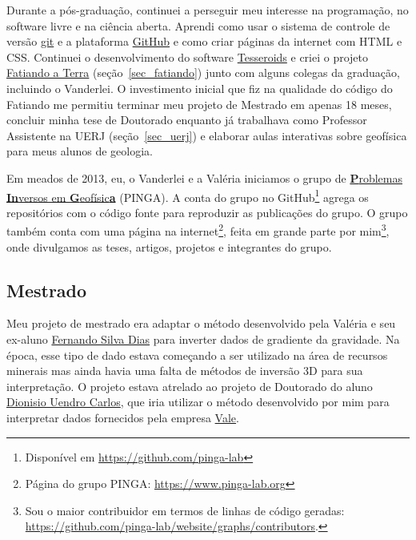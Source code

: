 \documentclass[10pt,a4paper,oneside]{book}
\begin{document}
Durante a pós-graduação, continuei a perseguir meu interesse na programação,
no software livre e na ciência aberta.
Aprendi como usar o sistema de controle de versão
\href{https://git-scm.com/}{git} e a plataforma
\href{https://github.com}{GitHub} e como criar páginas da internet com HTML e
CSS.
Continuei o desenvolvimento do software \href{https://tesseroids.leouieda.com/}{Tesseroids}
e criei o projeto \href{https://www.fatiando.org}{Fatiando a Terra}
(seção~\ref{sec_fatiando}) junto com alguns colegas da graduação, incluindo o
Vanderlei.
O investimento inicial que fiz na qualidade do código do Fatiando me
permitiu terminar meu projeto de Mestrado em apenas 18 meses,
concluir minha tese de Doutorado enquanto já trabalhava como Professor
Assistente na UERJ (seção~\ref{sec_uerj}) e elaborar aulas interativas sobre
geofísica para meus alunos de geologia.

Em meados de 2013, eu, o Vanderlei e a Valéria iniciamos o grupo de
\href{https://www.pinga-lab.org/}{\textbf{P}roblemas \textbf{In}versos em \textbf{G}eofísic\textbf{a}}
(PINGA).
A conta do grupo no GitHub\footnote{Disponível em \url{https://github.com/pinga-lab}}
agrega os repositórios com o código fonte para reproduzir as publicações do
grupo.
O grupo também conta com uma página na internet\footnote{Página do grupo PINGA: \url{https://www.pinga-lab.org}},
feita em grande parte por mim\footnote{Sou o maior contribuidor em termos de
linhas de código geradas:
\url{https://github.com/pinga-lab/website/graphs/contributors}.},
onde divulgamos as teses, artigos, projetos e integrantes do grupo.

\subsection{Mestrado}

Meu projeto de mestrado era adaptar o método desenvolvido
pela Valéria e seu ex-aluno
\href{https://www.researchgate.net/profile/Fernando-Dias-8}{Fernando Silva Dias}
\citep{SilvaDias2009} para inverter dados de gradiente da gravidade.
Na época, esse tipo de dado estava começando a ser utilizado na área de
recursos minerais mas ainda havia uma falta de métodos de inversão 3D para sua
interpretação.
O projeto estava atrelado ao projeto de Doutorado do aluno
\href{https://www.linkedin.com/in/dionisio-uendro-carlos-093671225/}{Dionisio Uendro Carlos},
que iria utilizar o método desenvolvido por mim para interpretar dados
fornecidos pela empresa \href{https://vale.com/}{Vale}.
\end{document}
